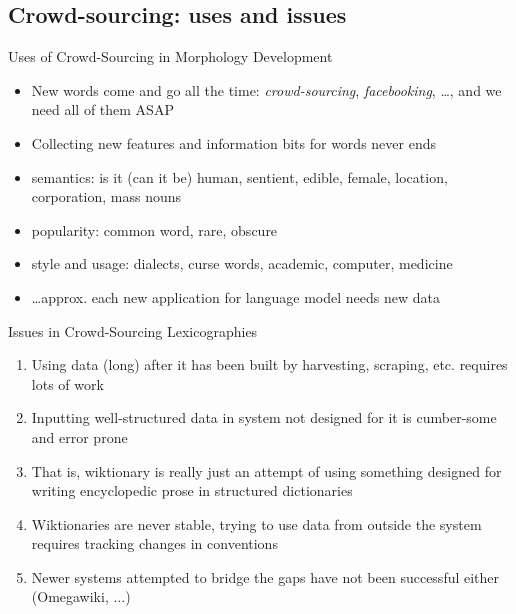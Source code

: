 \documentclass[t,12pt]{beamer}
\begin{document}
\subsection{Crowd-sourcing: uses and issues}

\begin{frame}{Uses of Crowd-Sourcing in Morphology Development}
    \begin{itemize}
        \item New words come and go all the time: \emph{crowd-sourcing}, 
            \emph{facebooking}, \ldots, and we need all of them ASAP
        \item Collecting new features and information bits for words never ends
        \item semantics: is it (can it be) human, sentient, edible, female,
            location, corporation, mass nouns
        \item popularity: common word, rare, obscure
        \item style and usage: dialects, curse words, academic, computer,
            medicine
        \item \ldots approx. each new application for language model needs new
            data
    \end{itemize}
\end{frame}

\begin{frame}{Issues in Crowd-Sourcing Lexicographies}
    \begin{enumerate}
        \item Using data (long) after it has been built by harvesting, scraping,
            etc. requires lots of work
        \item Inputting well-structured data in system not designed for it is
            cumber-some and error prone
        \item That is, wiktionary is really just an attempt of using something
            designed for writing encyclopedic prose in structured dictionaries
        \item Wiktionaries are never stable, trying to use data from outside
            the system requires tracking changes in conventions
        \item Newer systems attempted to bridge the gaps have not been 
            successful either (Omegawiki, ...)
    \end{enumerate}
\end{frame}
\end{document}
